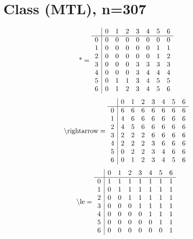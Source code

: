 \documentclass[11pt]{article}
\begin{document}
\section{Class (MTL), n=307}
\[\text{*} = 
\begin{array}{r | r r r r r r r}
 & 0 & 1 & 2 & 3 & 4 & 5 & 6 \\ \hline
0 & 0 & 0 & 0 & 0 & 0 & 0 & 0 \\
1 & 0 & 0 & 0 & 0 & 0 & 1 & 1 \\
2 & 0 & 0 & 0 & 0 & 0 & 1 & 2 \\
3 & 0 & 0 & 0 & 3 & 3 & 3 & 3 \\
4 & 0 & 0 & 0 & 3 & 4 & 4 & 4 \\
5 & 0 & 1 & 1 & 3 & 4 & 5 & 5 \\
6 & 0 & 1 & 2 & 3 & 4 & 5 & 6 \\
\end{array}
\]
\[\text{\textbackslash rightarrow} = 
\begin{array}{r | r r r r r r r}
 & 0 & 1 & 2 & 3 & 4 & 5 & 6 \\ \hline
0 & 6 & 6 & 6 & 6 & 6 & 6 & 6 \\
1 & 4 & 6 & 6 & 6 & 6 & 6 & 6 \\
2 & 4 & 5 & 6 & 6 & 6 & 6 & 6 \\
3 & 2 & 2 & 2 & 6 & 6 & 6 & 6 \\
4 & 2 & 2 & 2 & 3 & 6 & 6 & 6 \\
5 & 0 & 2 & 2 & 3 & 4 & 6 & 6 \\
6 & 0 & 1 & 2 & 3 & 4 & 5 & 6 \\
\end{array}
\]
\[\text{\textbackslash le} = 
\begin{array}{r | r r r r r r r}
 & 0 & 1 & 2 & 3 & 4 & 5 & 6 \\ \hline
0 & 1 & 1 & 1 & 1 & 1 & 1 & 1 \\
1 & 0 & 1 & 1 & 1 & 1 & 1 & 1 \\
2 & 0 & 0 & 1 & 1 & 1 & 1 & 1 \\
3 & 0 & 0 & 0 & 1 & 1 & 1 & 1 \\
4 & 0 & 0 & 0 & 0 & 1 & 1 & 1 \\
5 & 0 & 0 & 0 & 0 & 0 & 1 & 1 \\
6 & 0 & 0 & 0 & 0 & 0 & 0 & 1 \\
\end{array}
\]
\end{document}
